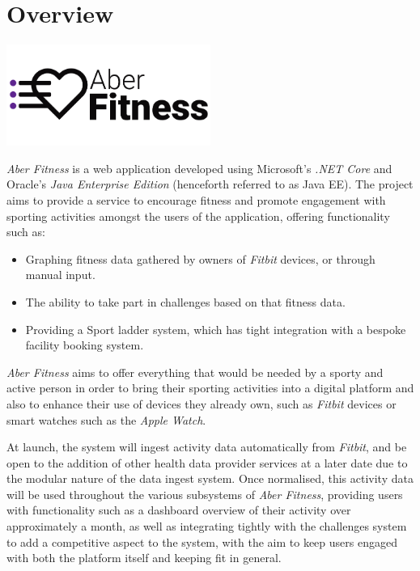\chapter{Overview}

\begin{center}
	\includegraphics[width=0.5\textwidth]{Images/aberfitness.png}
\end{center}

\par
\textit{Aber Fitness} is a web application developed using Microsoft's \textit{.NET Core} and Oracle's \textit{Java Enterprise Edition} (henceforth referred to as Java EE). The project aims to provide a service to encourage fitness and promote engagement with sporting activities amongst the users of the application, offering functionality such as:

\begin{itemize}
\item Graphing fitness data gathered by owners of \textit{Fitbit} devices, or through manual input.
\item The ability to take part in challenges based on that fitness data.
\item Providing a Sport ladder system, which has tight integration with a bespoke facility booking system.
\end{itemize}

\textit{Aber Fitness} aims to offer everything that would be needed by a sporty and active person in order to bring their sporting activities into a digital platform and also to enhance their use of devices they already own, such as \textit{Fitbit} devices or smart watches such as the \textit{Apple Watch}.

\par
At launch, the system will ingest activity data automatically from \textit{Fitbit}, and be open to the addition of other health data provider services at a later date due to the modular nature of the data ingest system. Once normalised, this activity data will be used throughout the various subsystems of \textit{Aber Fitness}, providing users with functionality such as a dashboard overview of their activity over approximately a month, as well as integrating tightly with the challenges system to add a competitive aspect to the system, with the aim to keep users engaged with both the platform itself and keeping fit in general. 

